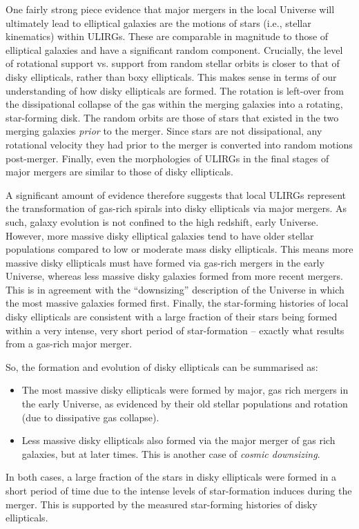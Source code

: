 \documentclass[11pt]{article}
\begin{document}
One fairly strong piece evidence that major mergers in the local
Universe will ultimately lead to elliptical galaxies are the motions
of stars (i.e., stellar kinematics) within ULIRGs. These are
comparable in magnitude to those of elliptical galaxies and have a
significant random component. Crucially, the level of rotational
support vs. support from random stellar orbits is closer to that of
disky ellipticals, rather than boxy ellipticals. This makes sense in
terms of our understanding of how disky ellipticals are formed. The
rotation is left-over from the dissipational collapse of the gas
within the merging galaxies into a rotating, star-forming disk. The
random orbits are those of stars that existed in the two merging
galaxies {\it prior} to the merger. Since stars are not dissipational,
any rotational velocity they had prior to the merger is converted into
random motions post-merger. Finally, even the morphologies of ULIRGs
in the final stages of major mergers are similar to those of disky
ellipticals.

A significant amount of evidence therefore suggests that local ULIRGs
represent the transformation of gas-rich spirals into disky
ellipticals via major mergers. As such, galaxy evolution is not
confined to the high redshift, early Universe. However, more massive
disky elliptical galaxies tend to have older stellar populations
compared to low or moderate mass disky ellipticals. This means more
massive disky ellipticals must have formed via gas-rich mergers in the
early Universe, whereas less massive disky galaxies formed from more
recent mergers. This is in agreement with the ``downsizing''
description of the Universe in which the most massive galaxies formed
first. Finally, the star-forming histories of local disky ellipticals
are consistent with a large fraction of their stars being formed
within a very intense, very short period of star-formation -- exactly
what results from a gas-rich major merger.

So, the formation and evolution of disky ellipticals can be summarised
as:
\begin{itemize}
\item The most massive disky ellipticals were formed by major, gas
  rich mergers in the early Universe, as evidenced by their old
  stellar populations and rotation (due to dissipative gas collapse).
\item Less massive disky ellipticals also formed via the major merger
  of gas rich galaxies, but at later times. This is another case of
  {\it cosmic downsizing}.
\end{itemize}
In both cases, a large fraction of the stars in disky ellipticals were
formed in a short period of time due to the intense levels of
star-formation induces during the merger. This is supported by
the measured star-forming histories of disky ellipticals.
\end{document}
